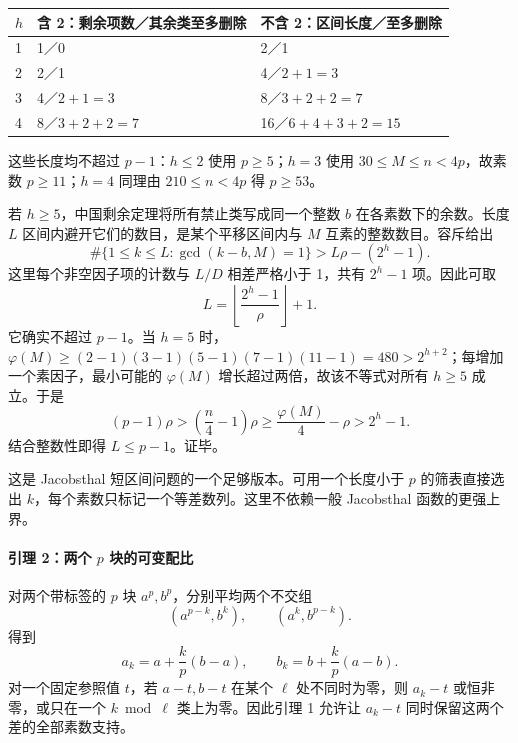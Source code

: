 { %
\begin{longtable}[]{@{}lll@{}}
\toprule\noalign{}
\(h\) & {含} {2：剩余项数／其余类至多删除} & {不含} {2：区间长度／至多删除} \\
\midrule\noalign{}
\endhead
\bottomrule\noalign{}
\endlastfoot
{1} & {1／0} & {2／1} \\
{2} & {2／1} & {4／}\(2+1=3\) \\
{3} & {4／}\(2+1=3\) & {8／}\(3+2+2=7\) \\
{4} & {8／}\(3+2+2=7\) & {16／}\(6+4+3+2=15\) \\
\end{longtable}
}

{这些长度均不超过} \(p-1\){：}\(h\le2\) {使用} \(p\ge5\){；}\(h=3\) {使用} \(30\le M\le n<4p\){，故素数} \(p\ge11\){；}\(h=4\) {同理由} \(210\le n<4p\) {得} \(p\ge53\){。}

{若} \(h\ge5\){，中国剩余定理将所有禁止类写成同一个整数} \(b\) {在各素数下的余数。长度} \(L\) {区间内避开它们的数目，是某个平移区间内与} \(M\) {互素的整数数目。容斥给出} \[
\#\{1\le k\le L:\gcd(k-b,M)=1\}
>L\rho-(2^h-1).
\tag{C8.3}
\] {这里每个非空因子项的计数与} \(L/D\) {相差严格小于} {1，共有} \(2^h-1\) {项。因此可取} \[
L=\left\lfloor\frac{2^h-1}{\rho}\right\rfloor+1.
\tag{C8.4}
\] {它确实不超过} \(p-1\){。当} \(h=5\) {时，}\(\varphi(M)\ge(2-1)(3-1)(5-1)(7-1)(11-1)=480>2^{h+2}\){；每增加一个素因子，最小可能的} \(\varphi(M)\) {增长超过两倍，故该不等式对所有} \(h\ge5\) {成立。于是} \[
(p-1)\rho>
\left(\frac n4-1\right)\rho
\ge\frac{\varphi(M)}4-\rho
>2^h-1.
\] {结合整数性即得} \(L\le p-1\){。证毕。}

{这是} {Jacobsthal} {短区间问题的一个足够版本。可用一个长度小于} \(p\) {的筛表直接选出} \(k\){，每个素数只标记一个等差数列。这里不依赖一般} {Jacobsthal} {函数的更强上界。}

\paragraph*{\texorpdfstring{{引理} {2：两个} {\ensuremath{p}} {块的可变配比}}{引理 2：两个  块的可变配比}}\label{C8-h48}

{对两个带标签的} \(p\) {块} \(a^p,b^p\){，分别平均两个不交组} \[
(a^{p-k},b^k),\qquad(a^k,b^{p-k}).
\] {得到} \[
a_k=a+\frac{k}{p}(b-a),\qquad
b_k=b+\frac{k}{p}(a-b).
\tag{C8.5}
\] {对一个固定参照值} \(t\){，若} \(a-t,b-t\) {在某个} \(\ell\) {处不同时为零，则} \(a_k-t\) {或恒非零，或只在一个} \(k\bmod\ell\) {类上为零。因此引理} {1} {允许让} \(a_k-t\) {同时保留这两个差的全部素数支持。}

